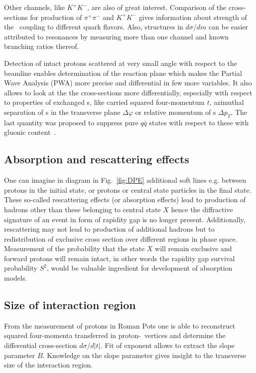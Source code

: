 Other channels, like $K^{+}K^{-}$, are also of great interest. Comparison of the cross-sections for production of $\pi^{+}\pi^{-}$ and $K^{+}K^{-}$ gives information about strength of the \Pomeron\ coupling to different quark flavors. Also, structures in $d\sigma/dm$ can be easier attributed to resonances by measuring more than one channel and known branching ratios thereof.

Detection of intact protons scattered at very small angle with respect to the beamline enables determination of the reaction plane which makes the Partial Wave Analysis (PWA) more precise and differential in few more variables. It also allows to look at the the cross-sections more differentially, especially with respect to properties of exchanged \Pomeron s, like carried squared four-momentum $t$, azimuthal separation of \Pomeron s in the transverse plane $\Delta\varphi$ or relative momentum of \Pomeron s $\Delta p_{T}$. The last quantity was proposed to suppress pure $q\bar{q}$ states with respect to these with gluonic content~\cite{DPtFilter}.\vspace{-3pt}

\subsection{Absorption and rescattering effects}

One can imagine in diagram in Fig.~\ref{fig:DPE} additional soft lines e.g. between protons in the initial state, or protons or central state particles in the final state. These so-called rescattering effects (or absorption effects) lead to production of hadrons other than these belonging to central state $X$ hence the diffractive signature of an event in form of rapidity gap is no longer present. Additionally, rescattering may not lead to production of additional hadrons but to redistribution of exclusive cross section over different regions in phase space. Measurement of the probability that the state $X$ will remain exclusive and forward protons will remain intact, in other words the rapidity gap survival probability $S^{2}$, would be valuable ingredient for development of absorption models.\vspace{-3pt}

\subsection{Size of interaction region}

From the measurement of protons in Roman Pots one is able to reconstruct squared four-momenta transferred in proton-\Pomeron\ vertices and determine the differential cross-section $d\sigma/d|t|$. Fit of exponent allows to extract the slope parameter $B$. Knowledge on the slope parameter gives insight to the transverse size of the interaction region.
